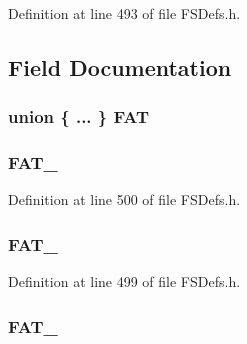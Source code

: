 Definition at line 493 of file F\+S\+Defs.\+h.



\subsection{Field Documentation}
\hypertarget{struct___boot_sec_ab71fec07fbc13e462442090c30d0eb06}{}
\subsubsection[{F\+A\+T}]{\setlength{\rightskip}{0pt plus 5cm}union \{ ... \}  F\+A\+T}\label{struct___boot_sec_ab71fec07fbc13e462442090c30d0eb06}
\hypertarget{struct___boot_sec_ad60e9ec565f9ff89e316d06a1beeaa48}{}
\subsubsection[{F\+A\+T\+\_\+12}]{ F\+A\+T\+\_}\label{struct___boot_sec_ad60e9ec565f9ff89e316d06a1beeaa48}


Definition at line 500 of file F\+S\+Defs.\+h.

\hypertarget{struct___boot_sec_a6b281272492ad45df204481e61ab5ddf}{}
\subsubsection[{F\+A\+T\+\_\+16}]{ F\+A\+T\+\_}\label{struct___boot_sec_a6b281272492ad45df204481e61ab5ddf}


Definition at line 499 of file F\+S\+Defs.\+h.

\hypertarget{struct___boot_sec_a8624001f392eee972fd2f43f56b070f4}{}
\subsubsection[{F\+A\+T\+\_\+32}]{ F\+A\+T\+\_}\label{struct___boot_sec_a8624001f392eee972fd2f43f56b070f4}


